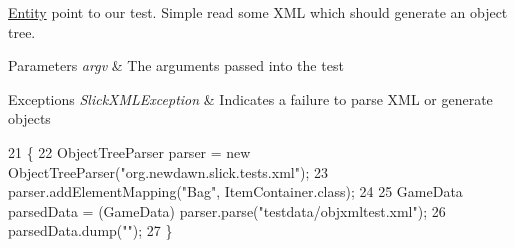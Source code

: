 \mbox{\hyperlink{classorg_1_1newdawn_1_1slick_1_1tests_1_1xml_1_1_entity}{Entity}} point to our test. Simple read some X\+ML which should generate an object tree.


\begin{DoxyParams}{Parameters}
{\em argv} & The arguments passed into the test \\
\hline
\end{DoxyParams}

\begin{DoxyExceptions}{Exceptions}
{\em Slick\+X\+M\+L\+Exception} & Indicates a failure to parse X\+ML or generate objects \\
\hline
\end{DoxyExceptions}

\begin{DoxyCode}
21                                                                     \{
22         ObjectTreeParser parser = \textcolor{keyword}{new} ObjectTreeParser(\textcolor{stringliteral}{"org.newdawn.slick.tests.xml"});
23         parser.addElementMapping(\textcolor{stringliteral}{"Bag"}, ItemContainer.class);
24         
25         GameData parsedData = (GameData) parser.parse(\textcolor{stringliteral}{"testdata/objxmltest.xml"});
26         parsedData.dump(\textcolor{stringliteral}{""});
27     \}
\end{DoxyCode}
